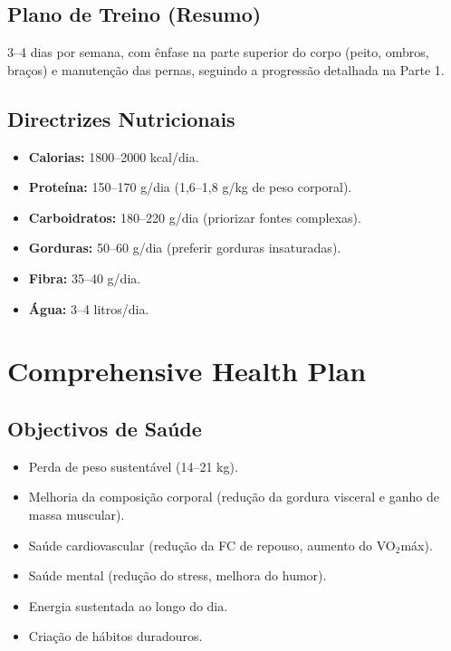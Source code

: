 \documentclass[12pt,a4paper]{scrartcl}
\begin{document}
\subsection{Plano de Treino (Resumo)}
3–4 dias por semana, com ênfase na parte superior do corpo (peito, ombros, braços) e manutenção das pernas, seguindo a progressão detalhada na Parte 1.

\subsection{Directrizes Nutricionais}
\begin{itemize}
    \item \textbf{Calorias:} 1800–2000 kcal/dia.
    \item \textbf{Proteína:} 150–170 g/dia (1,6–1,8 g/kg de peso corporal).
    \item \textbf{Carboidratos:} 180–220 g/dia (priorizar fontes complexas).
    \item \textbf{Gorduras:} 50–60 g/dia (preferir gorduras insaturadas).
    \item \textbf{Fibra:} 35–40 g/dia.
    \item \textbf{Água:} 3–4 litros/dia.
\end{itemize}

\section{Comprehensive Health Plan}
\subsection{Objectivos de Saúde}
\begin{itemize}
    \item Perda de peso sustentável (14–21 kg).
    \item Melhoria da composição corporal (redução da gordura visceral e ganho de massa muscular).
    \item Saúde cardiovascular (redução da FC de repouso, aumento do VO$_2$máx).
    \item Saúde mental (redução do stress, melhora do humor).
    \item Energia sustentada ao longo do dia.
    \item Criação de hábitos duradouros.
\end{itemize}
\end{document}
